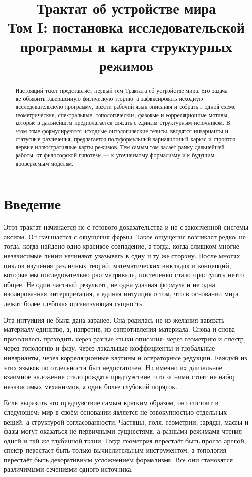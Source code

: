 \documentclass[12pt,a4paper]{article}
\title{Трактат об устройстве мира\\
Том I: постановка исследовательской программы и карта структурных режимов}
\author{}
\date{}
\begin{document}
\maketitle

\begin{abstract}
Настоящий текст представляет первый том Трактата об устройстве мира. Его задача --- не объявить завершённую физическую теорию, а зафиксировать исходную исследовательскую программу, ввести рабочий язык описания и собрать в одной схеме геометрические, спектральные, топологические, фазовые и корреляционные мотивы, которые в дальнейшем предполагается связать с единым структурным источником. В этом томе формулируются исходные онтологические тезисы, вводятся инварианты и статусные различения, предлагается полуформальный вариационный каркас и строятся первые иллюстративные карты режимов. Тем самым том задаёт рамку дальнейшей работы: от философской гипотезы --- к уточняемому формализму и к будущим проверяемым моделям.
\end{abstract}

\section{Введение}

Этот трактат начинается не с готового доказательства и не с законченной системы аксиом. Он начинается с ощущения формы. Такое ощущение возникает редко: не тогда, когда найдено одно красивое совпадение, а тогда, когда слишком многие независимые линии начинают указывать в одну и ту же сторону. После многих циклов изучения различных теорий, математических выкладок и концепций, которые мы последовательно рассматривали, постепенно стало проступать нечто общее. Не один частный результат, не одна удачная формула и не одна изолированная интерпретация, а единая интуиция о том, что в основании мира лежит более глубокая организующая сущность.

Эта интуиция не была дана заранее. Она родилась не из желания навязать материалу единство, а, напротив, из сопротивления материала. Снова и снова приходилось проходить через разные языки описания: через геометрию и спектр, через топологию и фазу, через локальные коэффициенты и глобальные инварианты, через корреляционные картины и операторные редукции. Каждый из этих языков по отдельности был недостаточен. Но именно их длительное взаимное наложение стало рождать предчувствие, что за ними стоит не набор независимых механизмов, а один более глубокий порядок.

Если выразить это предчувствие самым кратким образом, оно состоит в следующем: мир в своём основании является не совокупностью отдельных вещей, а структурой согласованности. Частицы, поля, геометрии, заряды, массы и фазы могут оказаться не первичными сущностями, а разными режимами чтения одной и той же глубинной ткани. Тогда геометрия перестаёт быть просто ареной, спектр перестаёт быть только вычислительным инструментом, а топология перестаёт быть декоративным усложнением формализма. Все они становятся различимыми сечениями одного источника.
\end{document}
